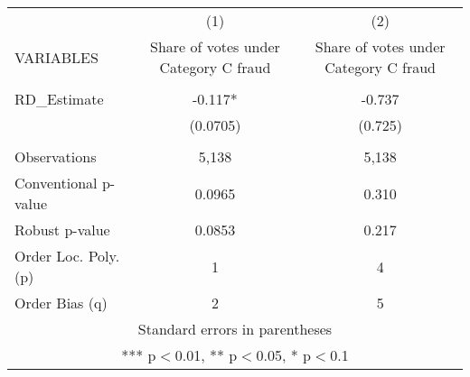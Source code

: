 \begin{tabular}{lcc} \hline
 & (1) & (2) \\
VARIABLES & Share of votes under Category C fraud & Share of votes under Category C fraud \\ \hline
 &  &  \\
RD\_Estimate & -0.117* & -0.737 \\
 & (0.0705) & (0.725) \\
 &  &  \\
Observations & 5,138 & 5,138 \\
Conventional p-value & 0.0965 & 0.310 \\
Robust p-value & 0.0853 & 0.217 \\
Order Loc. Poly. (p) & 1 & 4 \\
 Order Bias (q) & 2 & 5 \\ \hline
\multicolumn{3}{c}{ Standard errors in parentheses} \\
\multicolumn{3}{c}{ *** p$<$0.01, ** p$<$0.05, * p$<$0.1} \\
\end{tabular}
